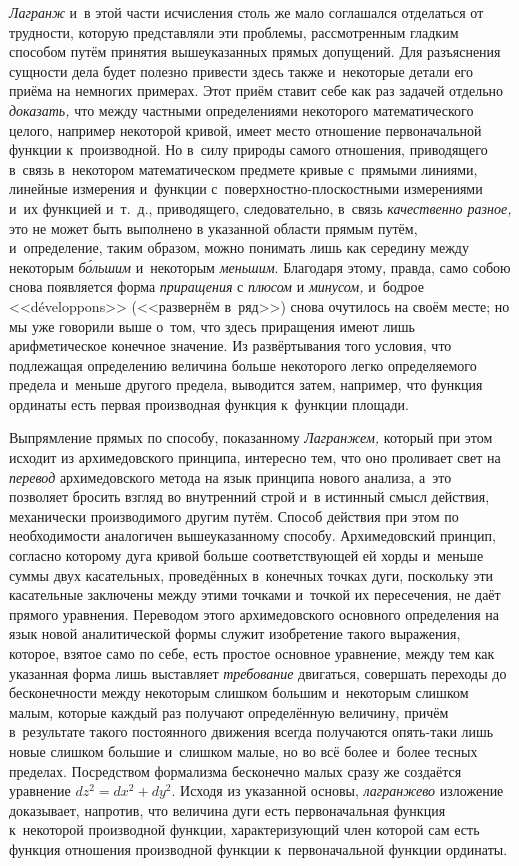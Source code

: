 {\em Лагранж} и~в этой части исчисления столь же мало соглашался отделаться от
трудности, которую представляли эти проблемы, рассмотренным гладким способом
путём принятия вышеуказанных прямых допущений. Для разъяснения сущности дела
будет полезно привести здесь также и~некоторые детали его приёма на немногих
примерах. Этот приём ставит себе как раз задачей отдельно {\em доказать,} что
между частными определениями некоторого математического целого, например
некоторой кривой, имеет место отношение первоначальной функции к~производной.
Но в~силу природы самого отношения, приводящего в~связь в~некотором
математическом предмете кривые с~прямыми линиями, линейные измерения и~функции
с~поверхностно-плоскостными измерениями и~их функцией и~т.~д., приводящего,
следовательно, в~связь {\em качественно разное,} это не может быть выполнено в
указанной области прямым путём, и~определение, таким образом, можно понимать
лишь как середину между некоторым {\em б\'{о}льшим} и~некоторым {\em меньшим}.
Благодаря этому, правда, само собою снова появляется форма {\em приращения} с
{\em плюсом} и {\em минусом,} и~бодрое <<développons>> (<<развернём в~ряд>>)
снова очутилось на своём месте; но мы уже говорили выше о~том, что здесь
приращения имеют лишь арифметическое конечное значение. Из развёртывания того
условия, что подлежащая определению величина больше некоторого легко
определяемого предела и~меньше другого предела, выводится затем, например, что
функция ординаты есть первая производная функция к~функции площади.

Выпрямление прямых по способу, показанному {\em Лагранжем,} который при этом
исходит из архимедовского принципа, интересно тем, что оно проливает свет на
{\em перевод} архимедовского метода на язык принципа нового анализа, а~это
позволяет бросить взгляд во внутренний строй и~в истинный смысл действия,
механически производимого другим путём. Способ действия при этом по
необходимости аналогичен вышеуказанному способу. Архимедовский принцип,
согласно которому дуга кривой больше соответствующей ей хорды и~меньше суммы
двух касательных, проведённых в~конечных точках дуги, поскольку эти касательные
заключены между этими точками и~точкой их пересечения, не даёт прямого
уравнения. Переводом этого архимедовского основного определения на язык новой
аналитической формы служит изобретение такого выражения, которое, взятое само
по себе, есть простое основное уравнение, между тем как указанная форма лишь
выставляет {\em требование} двигаться, совершать переходы до бесконечности
между некоторым слишком большим и~некоторым слишком малым, которые каждый раз
получают определённую величину, причём в~результате такого постоянного движения
всегда получаются опять-таки лишь новые слишком большие и~слишком малые, но во
всё более и~более тесных пределах. Посредством формализма бесконечно малых
сразу же создаётся уравнение $dz^2=dx^2+dy^2$. Исходя из указанной основы,
{\em лагранжево} изложение доказывает, напротив, что величина дуги есть
первоначальная функция к~некоторой производной функции, характеризующий член
которой сам есть функция отношения производной функции к~первоначальной функции
ординаты.

